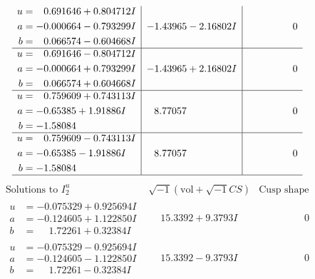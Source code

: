 \documentclass[1p]{elsarticle_modified}
\theoremstyle{definition}
\newcommand{\I}{\sqrt{-1}}
\begin{document}
$$\begin{array}{c|c|c}
\begin{aligned}
u &= \phantom{-}0.691646 + 0.804712 I \\
a &= -0.000664 - 0.793299 I \\
b &= \phantom{-}0.066574 - 0.604668 I\end{aligned}
 & -1.43965 - 2.16802 I & \phantom{-0.000000 } 0 \\ \hline\begin{aligned}
u &= \phantom{-}0.691646 - 0.804712 I \\
a &= -0.000664 + 0.793299 I \\
b &= \phantom{-}0.066574 + 0.604668 I\end{aligned}
 & -1.43965 + 2.16802 I & \phantom{-0.000000 } 0 \\ \hline\begin{aligned}
u &= \phantom{-}0.759609 + 0.743113 I \\
a &= -0.65385 + 1.91886 I \\
b &= -1.58084\phantom{ +0.000000I}\end{aligned}
 & \phantom{-}8.77057\phantom{ +0.000000I} & \phantom{-0.000000 } 0 \\ \hline\begin{aligned}
u &= \phantom{-}0.759609 - 0.743113 I \\
a &= -0.65385 - 1.91886 I \\
b &= -1.58084\phantom{ +0.000000I}\end{aligned}
 & \phantom{-}8.77057\phantom{ +0.000000I} & \phantom{-0.000000 } 0\\
 \hline 
 \end{array}$$\newpage$$\begin{array}{c|c|c}  
\text{Solutions to }I^u_{2}& \I (\text{vol} + \sqrt{-1}CS) & \text{Cusp shape}\\
 \hline 
\begin{aligned}
u &= -0.075329 + 0.925694 I \\
a &= -0.124605 + 1.122850 I \\
b &= \phantom{-}1.72261 + 0.32384 I\end{aligned}
 & \phantom{-}15.3392 + 9.3793 I & \phantom{-0.000000 } 0 \\ \hline\begin{aligned}
u &= -0.075329 - 0.925694 I \\
a &= -0.124605 - 1.122850 I \\
b &= \phantom{-}1.72261 - 0.32384 I\end{aligned}
 & \phantom{-}15.3392 - 9.3793 I & \phantom{-0.000000 } 0 \\ \hline\begin{aligned}

\end{aligned}
\end{array}$$
\end{document}
